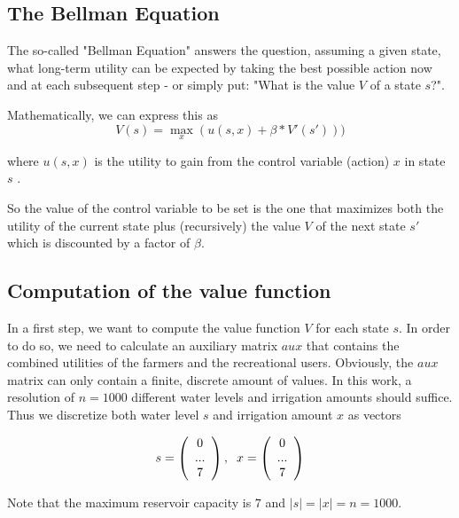 \documentclass[12pt, a4paper, oneside]{article}
\begin{document}
\subsection{The Bellman Equation}

The so-called "Bellman Equation" answers the question, assuming a given state, what long-term utility can be expected by taking the best possible action now and at each subsequent step - or simply put: "What is the value $V$ of a state $s$?". 

Mathematically, we can express this as  
\begin{equation}
V(s) = \max_{x}(u(s,x) + \beta*V'(s')))
\end{equation}

where $u(s,x)$ is the utility to gain from the control variable (action) $x$ in state $s$ \citep{seminar:week3}. 

So the value of the control variable to be set is the one that maximizes both the utility of the current state plus (recursively) the value $V$ of the next state $s'$ which is discounted by a factor of $\beta$. 


\subsection{Computation of the value function}

In a first step, we want to compute the value function $V$ for each state $s$. 
In order to do so, we need to calculate an auxiliary matrix $aux$ that contains the combined utilities of the farmers and the recreational users. 
Obviously, the $aux$ matrix can only contain a finite, discrete amount of values. In this work, a resolution of $n = 1000$ different water levels and irrigation amounts should suffice. 
Thus we discretize both water level $s$ and irrigation amount $x$ as vectors

	\begin{equation}
s = \left( \begin{array}{c}0\\...\\7\end{array}\right),\hspace{2mm}x = \left( \begin{array}{c}0\\...\\7\end{array}\right)
\end{equation}

Note that the maximum reservoir capacity is $7$ and $|s|=|x| = n = 1000$. 
\end{document}
